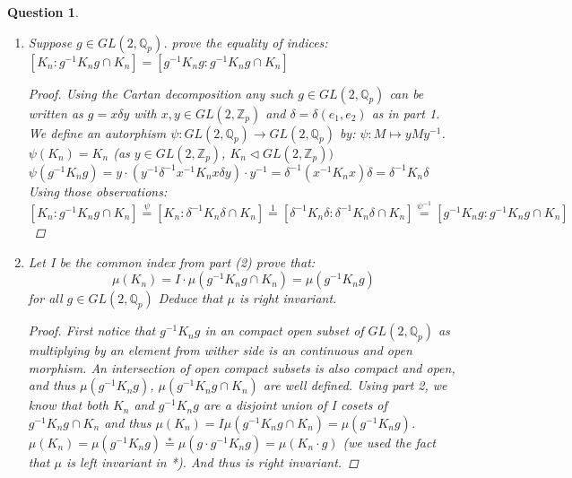 \documentclass[11pt]{article}
\newtheorem{quest}[thm]{Question}
\theoremstyle{definition}
\theoremstyle{lemma}
\theoremstyle{conclusion}
\def\zint{\mathbb{Z}}
\def\zp{\zint_{p}}
\def\qp{\mathbb{Q}_{p}}
\def\gl#1{GL(2, #1)}
\def\glzp{\gl{\zp}}
\def\glqp{\gl{\qp}}
\numberwithin{equation}{section}
\begin{document}
\begin{quest}
\begin{enumerate}
\begin{proof}
\\From the previous observations we can verify that $\varphi$ maps $K_n$ onto $\delta^{-1} K_n  \delta$ and vice versa. And thus it induces an isomorphism between them and we conclude that
$$[K_n:\delta^{-1}K_n\delta \cap K_n]=
[\varphi(K_n):\varphi(\delta^{-1}K_n\delta \cap K_n)] = [\delta^{-1}K_n\delta:\delta^{-1}K_n\delta \cap K_n] = p^{e_2 - e_1} $$
\end{proof}
\item Suppose $g \in \glqp$. prove the equality of indices: 
\\ $[K_n:g^{-1}K_ng \cap K_n] =  [g^{-1}K_n g :g^{-1}K_n g \cap K_n]$
\begin{proof}
Using the Cartan decomposition any such $g \in \glqp$ can be written as $g = x \delta y$ with $x,y \in \glzp$ and $\delta = \delta(e_1,e_2)$ as in part 1.
We define an autorphism $\psi: \glqp \rightarrow \glqp$ by: $\psi: M \mapsto y M y^{-1}$.
\\ $\psi(K_n) = K_n$ (as $y \in \glzp$, $K_n\lhd \glzp)$
\\ $\psi(g^{-1}K_ng) =y \cdot( y^{-1}\delta^{-1}x^{-1}K_n x \delta y) \cdot y^{-1} = \delta^{-1}(x^{-1}K_nx)\delta = \delta^{-1}K_n\delta$
\\ Using those observations:
\\ $[K_n:g^{-1}K_ng \cap K_n]\stackrel{\psi}{=}[K_n:\delta^{-1}K_n\delta \cap K_n] \stackrel{1}{=}  [\delta^{-1}K_n\delta:\delta^{-1}K_n\delta \cap K_n] \stackrel{\psi^{-1}}{=} [g^{-1}K_n g :g^{-1}K_n g \cap K_n]$
\end{proof}
\item Let I be the common index from part (2) prove that:
$$ \mu(K_n) = I \cdot \mu(g^{-1}K_ng \cap K_n)= \mu(g^{-1}K_ng)$$ for all $g \in \glqp$ Deduce that $\mu$ is right invariant.
\begin{proof}
First notice that $g^{-1}K_ng$ in an compact open subset of $\glqp$ as multiplying by an element from wither side is an continuous and open morphism. An intersection of open compact subsets is also compact and open, and thus $\mu(g^{-1} K_n g)$, $\mu(g^{-1} K_n g \cap K_n)$ are well defined.
Using part 2, we know that both $K_n$ and $g^{-1} K_n g$  are a disjoint union of  I cosets of $ g^{-1} K_n g \cap K_n$ and thus $\mu(K_n) = I \mu( g^{-1} K_n g \cap K_n) = \mu( g^{-1} K_n g)$.
$\mu(K_n) = \mu(  g^{-1} K_n g) \stackrel{*}{=} \mu(g \cdot  g^{-1} K_n g) = \mu(K_n \cdot g)$ (we used the fact that $\mu$ is left invariant in *). And thus is right invariant.
\end{proof}
\end{enumerate}
\end{quest}
\end{document}
